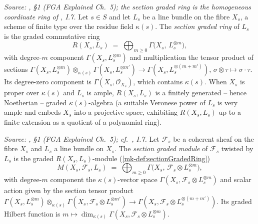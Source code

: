 \begin{definition}
  \label{mk-def:sectionGradedRing}

  \textit{Source: \cite{nitsure-hilbert-quot}, \S 1 (FGA Explained Ch.~5); the section graded
  ring is the homogeneous coordinate ring of \cite{hartshorne-ag}, I.7.}
  Let \(s \in S\) and let \(L_s\) be a line bundle on the fibre \(X_s\), a scheme
  of finite type over the residue field \(\kappa(s)\). The \emph{section graded
  ring} of \(L_s\) is the graded commutative ring
  \[
    R(X_s, L_s) \;=\; \bigoplus_{m \ge 0} \Gamma\bigl(X_s,\, L_s^{\otimes m}\bigr),
  \]
  with degree-\(m\) component \(\Gamma(X_s, L_s^{\otimes m})\) and multiplication
  the tensor product of sections
  \(\Gamma(X_s, L_s^{\otimes m}) \otimes_{\kappa(s)}
  \Gamma(X_s, L_s^{\otimes m'}) \to \Gamma(X_s, L_s^{\otimes (m+m')})\),
  \(\sigma \otimes \tau \mapsto \sigma \cdot \tau\). Its degree-zero component is
  \(\Gamma(X_s, \mathcal{O}_{X_s})\), which contains \(\kappa(s)\). When \(X_s\) is
  proper over \(\kappa(s)\) and \(L_s\) is ample, \(R(X_s, L_s)\) is a finitely
  generated -- hence Noetherian -- graded \(\kappa(s)\)-algebra (a suitable
  Veronese power of \(L_s\) is very ample and embeds \(X_s\) into a projective
  space, exhibiting \(R(X_s, L_s)\) up to a finite extension as a quotient of a
  polynomial ring).
\end{definition}

\begin{definition}
  \label{mk-def:sectionGradedModule}

  \textit{Source: \cite{nitsure-hilbert-quot}, \S 1 (FGA Explained Ch.~5); cf.\ \cite{hartshorne-ag},
  I.7.}
  Let \(\mathcal{F}_s\) be a coherent sheaf on the fibre \(X_s\) and \(L_s\) a
  line bundle on \(X_s\). The \emph{section graded module} of \(\mathcal{F}_s\)
  twisted by \(L_s\) is the graded \(R(X_s, L_s)\)-module
  (\ref{mk-def:sectionGradedRing})
  \[
    M(X_s, \mathcal{F}_s, L_s)
    \;=\; \bigoplus_{m \ge 0} \Gamma\bigl(X_s,\, \mathcal{F}_s \otimes L_s^{\otimes m}\bigr),
  \]
  with degree-\(m\) component the \(\kappa(s)\)-vector space
  \(\Gamma(X_s, \mathcal{F}_s \otimes L_s^{\otimes m})\) and scalar action given
  by the section tensor product
  \(\Gamma(X_s, L_s^{\otimes m}) \otimes_{\kappa(s)}
  \Gamma(X_s, \mathcal{F}_s \otimes L_s^{\otimes m'})
  \to \Gamma(X_s, \mathcal{F}_s \otimes L_s^{\otimes (m+m')})\). Its graded Hilbert
  function is \(m \mapsto \dim_{\kappa(s)}
  \Gamma(X_s, \mathcal{F}_s \otimes L_s^{\otimes m})\).
\end{definition}

